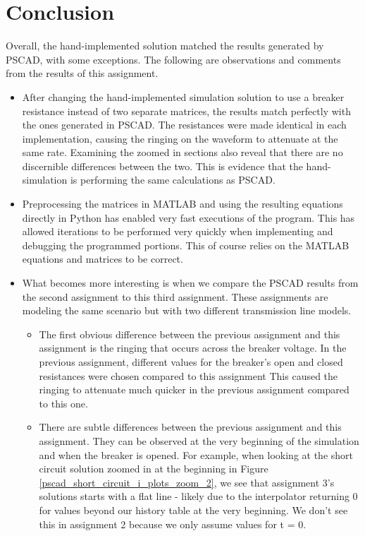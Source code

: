 \documentclass[10pt, oneside, letterpaper]{article}
\begin{document}
\section{Conclusion}
Overall, the hand-implemented solution matched the results generated by PSCAD, with some exceptions. The following are observations and comments from the results of this assignment.
\begin{itemize}
    \item After changing the hand-implemented simulation solution to use a breaker resistance instead of two separate matrices, the results match perfectly with the ones generated in PSCAD. The resistances were made identical in each implementation, causing the ringing on the waveform to attenuate at the same rate. Examining the zoomed in sections also reveal that there are no discernible differences between the two. This is evidence that the hand-simulation is performing the same calculations as PSCAD.
    \item Preprocessing the matrices in MATLAB and using the resulting equations directly in Python has enabled very fast executions of the program. This has allowed iterations to be performed very quickly when implementing and debugging the programmed portions. This of course relies on the MATLAB equations and matrices to be correct.
    \item What becomes more interesting is when we compare the PSCAD results from the second assignment to this third assignment. These assignments are modeling the same scenario but with two different transmission line models.
    \begin{itemize}
      \item The first obvious difference between the previous assignment and this assignment is the ringing that occurs across the breaker voltage. In the previous assignment, different values for the breaker's open and closed resistances were chosen compared to this assignment This caused the ringing to attenuate much quicker in the previous assignment compared to this one.
      \item There are subtle differences between the previous assignment and this assignment. They can be observed at the very beginning of the simulation and when the breaker is opened. For example, when looking at the short circuit solution zoomed in at the beginning in Figure \ref{pscad_short_circuit_i_plots_zoom_2}, we see that assignment 3's solutions starts with a flat line - likely due to the interpolator returning 0 for values beyond our history table at the very beginning. We don't see this in assignment 2 because we only assume values for t = 0.

\end{itemize}
\end{itemize}
\end{document}
